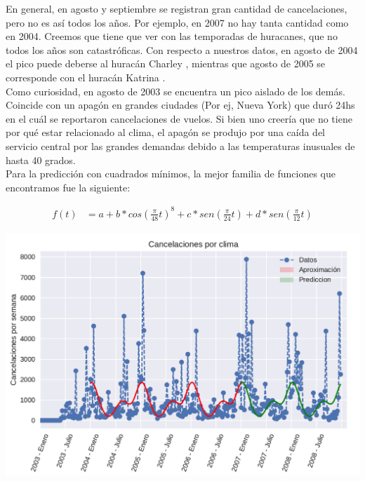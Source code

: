 En general, en agosto y septiembre se registran gran cantidad de cancelaciones, pero no es así todos los años. Por ejemplo, en 2007 no hay tanta cantidad como en 2004. Creemos que tiene que ver con las temporadas de huracanes, que no todos los años son catastróficas. Con respecto a nuestros datos, en agosto de 2004 el pico puede deberse al huracán Charley \cite{HuracanCharley}, mientras que agosto de 2005 se corresponde con el huracán Katrina \cite{HuracanKatrina}. \\

Como curiosidad, en agosto de 2003 se encuentra un pico aislado de los demás. Coincide con un apagón en grandes ciudades (Por ej, Nueva York) que duró 24hs en el cuál se reportaron cancelaciones de vuelos. Si bien uno creería que no tiene por qué estar relacionado al clima, el apagón se produjo por una caída del servicio central por las grandes demandas debido a las temperaturas inusuales de hasta 40 grados. \cite{ApagonNewYork} \\

Para la predicción con cuadrados mínimos, la mejor familia de funciones que encontramos fue la siguiente:

\begin{align}
f(t) &= a + b * cos(\frac{\pi}{48} t)^{8} + c * sen(\frac{\pi}{24} t) + d * sen(\frac{\pi}{12} t)
\end{align}

{\centering
    \includegraphics[scale=0.8]{informe/imagenes/cancelacionesPorClimaGeneralPrediccionV1.pdf} \\
}

